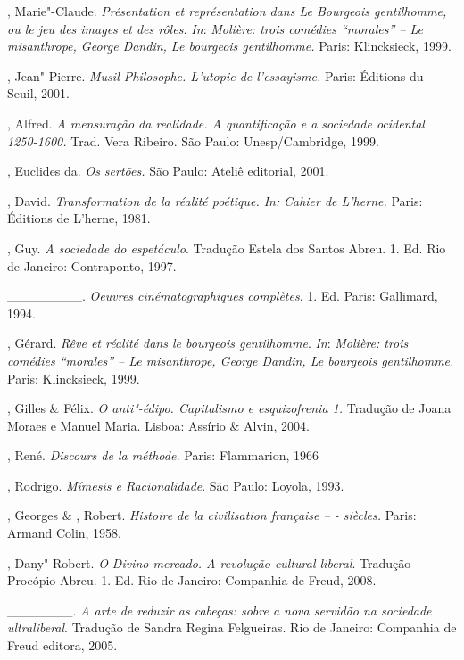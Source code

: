 \begin{Parskip}
, Marie"-Claude. \emph{Présentation et représentation dans Le
Bourgeois gentilhomme, ou le jeu des images et des rôles.} \emph{In}:
\emph{Molière: trois comédies ``morales'' -- Le misanthrope, George
Dandin, Le bourgeois gentilhomme.} Paris: Klincksieck, 1999.

, Jean"-Pierre. \emph{Musil Philosophe. L'utopie de
l'essayisme.} Paris: Éditions du Seuil, 2001.

, Alfred. \emph{A mensuração da realidade. A quantificação e a
sociedade ocidental 1250-1600.} Trad. Vera Ribeiro. São Paulo: Unesp/Cambridge, 1999.

, Euclides da. \emph{Os sertões.} São Paulo: Ateliê editorial, 2001.

, David. \emph{Transformation de la réalité poétique. In:}
\emph{Cahier de L'herne.} Paris: Éditions de L'herne, 1981.

, Guy. \emph{A sociedade do espetáculo}. Tradução Estela
dos Santos Abreu. 1. Ed. Rio de Janeiro: Contraponto, 1997.

\_\_\_\_\_\_\_\_. \emph{Oeuvres cinématographiques complètes}.
1. Ed. Paris: Gallimard, 1994.

, Gérard. \emph{Rêve et réalité dans le bourgeois gentilhomme}.
\emph{In}: \emph{Molière: trois comédies ``morales'' -- Le misanthrope, George
Dandin, Le bourgeois gentilhomme.} Paris: Klincksieck, 1999.

, Gilles \&  Félix. \emph{O anti"-édipo. Capitalismo e
esquizofrenia 1.} Tradução de Joana Moraes e Manuel Maria. Lisboa: Assírio \& Alvin, 2004.

, René. \emph{Discours de la méthode.} Paris: Flammarion, 1966

, Rodrigo. \emph{Mímesis e Racionalidade}. São Paulo: Loyola, 1993.

, Georges \& , Robert. \emph{Histoire de la civilisation
française -- - siècles.} Paris: Armand Colin, 1958.

, Dany"-Robert. \emph{O Divino mercado. A revolução cultural
liberal}. Tradução Procópio Abreu. 1. Ed. Rio de Janeiro: Companhia de Freud, 2008.

\_\_\_\_\_\_\_. \emph{A arte de reduzir as cabeças: sobre a nova
servidão na sociedade ultraliberal}. Tradução de Sandra Regina
Felgueiras. Rio de Janeiro: Companhia de Freud editora, 2005.


\end{Parskip}
